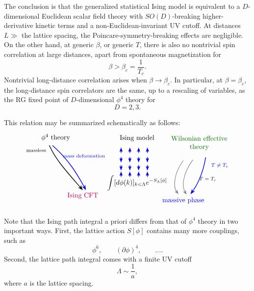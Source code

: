 The conclusion is that the generalized statistical Ising model is equivalent
to a \(D\)-dimensional Euclidean scalar field theory with \(SO(D)\)-breaking
higher-derivative kinetic terms and a non-Euclidean-invariant UV cutoff.  At
distances \(L\gg\) the lattice spacing, the Poincare-symmetry-breaking
effects are negligible.  On the other hand, at generic \(\beta\), or generic
\(T\), there is also no nontrivial spin correlation at large distances, apart
from spontaneous magnetization for
\[
  \beta>\beta_c=\frac{1}{T_c}.
\]
Nontrivial long-distance correlation arises when \(\beta\to\beta_c\).  In
particular, at \(\beta=\beta_c\), the long-distance spin correlators are the
same, up to a rescaling of variables, as the RG fixed point of
\(D\)-dimensional \(\phi^4\) theory for
\[
  D=2,3.
\]

This relation may be summarized schematically as follows:
\[
\begin{tikzpicture}[>=Stealth,scale=0.82,
  flow/.style={->,line width=1.0pt},
  soft/.style={gray,line width=.8pt,->}]
  \node at (-4.9,2.4) {\(\phi^4\) theory};
  \draw[flow] (-5.3,1.9) .. controls (-4.9,1.0) and (-4.2,.25) .. (-3.2,-.9);
  \draw[blue,flow] (-5.1,1.9) .. controls (-4.1,1.0) and (-3.6,.2) .. (-3.0,-.9);
  \node[anchor=east] at (-5.35,1.6) {\scriptsize massless};
  \node[blue,anchor=west] at (-4.6,1.25) {\scriptsize mass deformation};
  \node[purple] at (-3.2,-1.25) {Ising CFT};

  \node at (.2,2.35) {Ising model};
  \foreach \x in {-0.8,-0.25,0.3,0.85}
    \foreach \y/\s in {1.55/1,1.05/-1,.55/-1,.05/1}
    {
      \fill (\x,\y) circle (1.2pt);
      \draw[blue,->,line width=.8pt] (\x,{\y-0.13*\s}) -- (\x,{\y+0.22*\s});
    }
  \node at (.2,-.45) {\(\displaystyle
    \int [d\phi(k)]_{k<\Lambda}e^{-S_\Lambda[\phi]}\)};

  \node[green!45!black,align=center] at (4.1,2.05)
    {Wilsonian effective\\ theory};
  \draw[soft] (3.1,.95) .. controls (2.5,.15) and (2.45,-.7) .. (2.8,-1.15);
  \draw[soft] (3.7,1.0) .. controls (3.05,.1) and (3.0,-.65) .. (3.3,-1.18);
  \draw[blue,flow] (4.5,1.15) .. controls (4.35,.2) and (4.0,-.55) .. (3.55,-1.15);
  \node[blue,anchor=west] at (4.7,.65) {\scriptsize \(T\neq T_c\)};
  \node[black,anchor=west] at (3.95,-.2) {\scriptsize \(T=T_c\)};
  \node[blue] at (3.1,-1.55) {massive phase};
\end{tikzpicture}
\]

Note that the Ising path integral a priori differs from that of
\(\phi^4\) theory in two important ways.  First, the lattice action
\(S[\phi]\) contains many more couplings, such as
\[
  \phi^6,\qquad (\partial\phi)^4,\qquad \ldots .
\]
Second, the lattice path integral comes with a finite UV cutoff
\[
  \Lambda\sim\frac{1}{a},
\]
where \(a\) is the lattice spacing.


